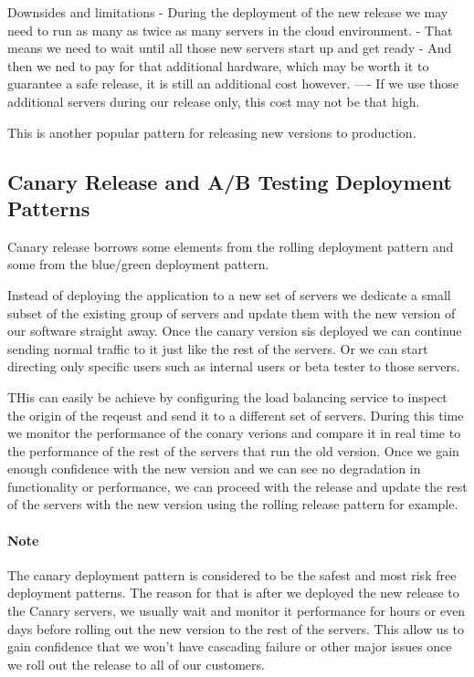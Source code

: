 \documentclass[a4paper, 11pt]{book}
\begin{document}
{    Downsides and limitations
    - During the deployment of the new release we may need to run as many as twice as many servers in the cloud environment.
    - That means we need to wait until all those new servers start up and get ready
    - And then we ned to pay for that additional hardware, which may be worth it to guarantee a safe release, it is still an additional cost however.
    ---- If we use those additional servers during our release only, this cost may not be that high.

    This is another popular pattern for releasing new versions to production.

    \subsection{Canary Release and A/B Testing Deployment Patterns}
    Canary release borrows some elements from the rolling deployment pattern and some from the blue/green deployment pattern.

    Instead of deploying the application to a new set of servers we dedicate a small subset of the existing group of servers and update them with the new version of our software straight away.
    Once the canary version sis deployed we can continue sending normal traffic to it just like the rest of the servers.
    Or we can start directing only specific users such as internal users or beta tester to those servers.

    THis can easily be achieve by configuring the load balancing service to inspect the origin of the reqeust and send it to a different set of servers.
    During this time we monitor the performance of the conary verions and compare it in real time to the performance of the rest of the servers that run the old version.
    Once we gain enough confidence with the new version and we can see no degradation in functionality or performance, we can proceed with the release and update the rest of the servers with the new version using the rolling release pattern for example.

    \paragraph{Note} The canary deployment pattern is considered to be the safest and most risk free deployment patterns.
    The reason for that is after we deployed the new release to the Canary servers, we usually wait and monitor it performance for hours or even days before rolling out the new version to the rest of the servers.
    This allow us to gain confidence that we won't have cascading failure or other major issues once we roll out the release to all of our customers.

}
\end{document}
